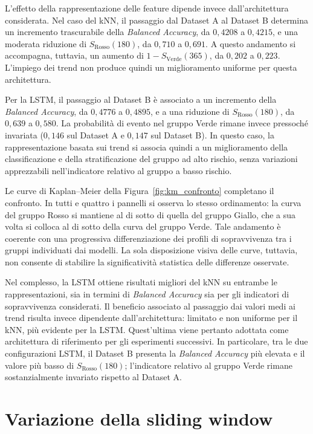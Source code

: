 \documentclass[a4paper,12pt]{report}
\begin{document}
L'effetto della rappresentazione delle feature dipende invece dall'architettura considerata. Nel caso del kNN, il passaggio dal Dataset A al Dataset B determina un incremento trascurabile della \textit{Balanced Accuracy}, da $0,4208$ a $0,4215$, e una moderata riduzione di $S_{\text{Rosso}}(180)$, da $0,710$ a $0,691$. A questo andamento si accompagna, tuttavia, un aumento di $1-S_{\text{Verde}}(365)$, da $0,202$ a $0,223$. L'impiego dei trend non produce quindi un miglioramento uniforme per questa architettura.

Per la LSTM, il passaggio al Dataset B è associato a un incremento della \textit{Balanced Accuracy}, da $0,4776$ a $0,4895$, e a una riduzione di $S_{\text{Rosso}}(180)$, da $0,639$ a $0,580$. La probabilità di evento nel gruppo Verde rimane invece pressoché invariata ($0,146$ sul Dataset A e $0,147$ sul Dataset B). In questo caso, la rappresentazione basata sui trend si associa quindi a un miglioramento della classificazione e della stratificazione del gruppo ad alto rischio, senza variazioni apprezzabili nell'indicatore relativo al gruppo a basso rischio.

Le curve di Kaplan--Meier della Figura~\ref{fig:km_confronto} completano il confronto. In tutti e quattro i pannelli si osserva lo stesso ordinamento: la curva del gruppo Rosso si mantiene al di sotto di quella del gruppo Giallo, che a sua volta si colloca al di sotto della curva del gruppo Verde. Tale andamento è coerente con una progressiva differenziazione dei profili di sopravvivenza tra i gruppi individuati dai modelli. La sola disposizione visiva delle curve, tuttavia, non consente di stabilire la significatività statistica delle differenze osservate.

Nel complesso, la LSTM ottiene risultati migliori del kNN su entrambe le rappresentazioni, sia in termini di \textit{Balanced Accuracy} sia per gli indicatori di sopravvivenza considerati. Il beneficio associato al passaggio dai valori medi ai trend risulta invece dipendente dall'architettura: limitato e non uniforme per il kNN, più evidente per la LSTM. Quest'ultima viene pertanto adottata come architettura di riferimento per gli esperimenti successivi. In particolare, tra le due configurazioni LSTM, il Dataset B presenta la \textit{Balanced Accuracy} più elevata e il valore più basso di $S_{\text{Rosso}}(180)$; l'indicatore relativo al gruppo Verde rimane sostanzialmente invariato rispetto al Dataset A.

\section{Variazione della sliding window}
\label{sec:sliding_window_variation}
\end{document}
